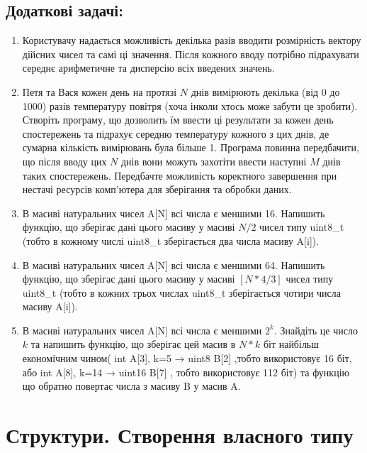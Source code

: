 \documentclass[a5paper,titlepage,openany,twoside,draft]{book_unv}%
\begin{document}
\section{Додаткові задачі:}

\begin{enumerate}
\def\labelenumi{\arabic{enumi})}
\setcounter{enumi}{8}
\item
  Користувачу надається можливість декілька разів вводити розмірність
  вектору дійсних чисел та самі ці значення. Після кожного вводу
  потрібно підрахувати середнє арифметичне та дисперсію всіх введених
  значень.
\item
  Петя та Вася кожен день на протязі $N$ днів вимірюють
  декілька (від 0 до 1000) разів температуру повітря (хоча інколи хтось
  може забути це зробити). Створіть програму, що дозволить їм ввести ці
  результати за кожен день спостережень та підрахує середню температуру
  кожного з цих днів, де сумарна кількість вимірювань була більше 1.
  Програма повинна передбачити, що після вводу цих $N$ днів вони можуть
  захотіти ввести наступні $M$ днів таких спостережень. Передбачте
  можливість коректного завершення при нестачі ресурсів комп'ютера для
  зберігання та обробки даних.
\item
 В масиві натуральних чисел A{[}N{]} всі числа є меншими 16. Напишить
  функцію, що зберігає дані цього масиву у масиві $N/2$ чисел типу
  uint8\_t (тобто в кожному числі uint8\_t зберігається два числа масиву
  A{[}i{]}).
\item
  В масиві натуральних чисел A{[}N{]} всі числа є меншими 64. Напишить
  функцію, що зберігає дані цього масиву у масиві $[N*4/3]$ чисел типу
  uint8\_t (тобто в кожних трьох числах uint8\_t зберігається чотири
  числа масиву A{[}i{]}).
\item
  В масиві натуральних чисел A{[}N{]} всі числа є меншими \(2^{k}\).
  Знайдіть це число $k$ та напишить функцію, що зберігає цей масив в $N*k$
  біт найбільш економічним чином( int A{[}3{]}, k=5 → uint8 B{[}2{]}
  ,тобто використовує 16 біт, або int A{[}8{]}, k=14 → uint16 B{[}7{]} ,
  тобто використовує 112 біт) та функцію що обратно повертає числа з
  масиву B у масив A.
\end{enumerate}



\chapter{Структури. Створення власного типу}
%
\end{document}
